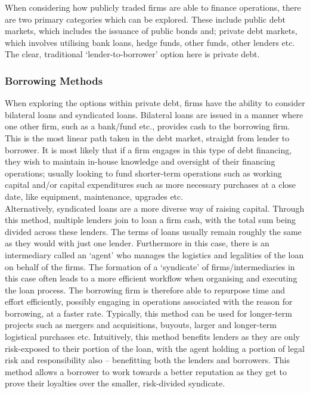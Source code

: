 \documentclass[11pt, english]{article}
\begin{document}
	When considering how publicly traded firms are able to finance operations, there are two primary categories which can be explored. These include public debt markets, which includes the issuance of public bonds and; private debt markets, which involves utilising bank loans, hedge funds, other funds, other lenders etc. The clear, traditional ‘lender-to-borrower’ option here is private debt.

		\subsubsection*{Borrowing Methods}

	When exploring the options within private debt, firms have the ability to consider bilateral loans and syndicated loans. Bilateral loans are issued in a manner where one other firm, such as a bank/fund etc., provides cash to the borrowing firm. This is the most linear path taken in the debt market, straight from lender to borrower. It is most likely that if a firm engages in this type of debt financing, they wish to maintain in-house knowledge and oversight of their financing operations; usually looking to fund shorter-term operations such as working capital and/or capital expenditures such as more necessary purchases at a close date, like equipment, maintenance, upgrades etc.\\

	Alternatively, syndicated loans are a more diverse way of raising capital. Through this method, multiple lenders join to loan a firm cash, with the total sum being divided across these lenders. The terms of loans usually remain roughly the same as they would with just one lender. Furthermore in this case, there is an intermediary called an ‘agent’ who manages the logistics and legalities of the loan on behalf of the firms. The formation of a ‘syndicate’ of firms/intermediaries in this case often leads to a more efficient workflow when organising and executing the loan process. The borrowing firm is therefore able to repurpose time and effort efficiently, possibly engaging in operations associated with the reason for borrowing, at a faster rate. Typically, this method can be used for longer-term projects such as mergers and acquisitions, buyouts, larger and longer-term logistical purchases etc. Intuitively, this method benefits lenders as they are only risk-exposed to their portion of the loan, with the agent holding a portion of legal risk and responsibility also – benefitting both the lenders and borrowers. This method allows a borrower to work towards a better reputation as they get to prove their loyalties over the smaller, risk-divided syndicate.\\
\end{document}
